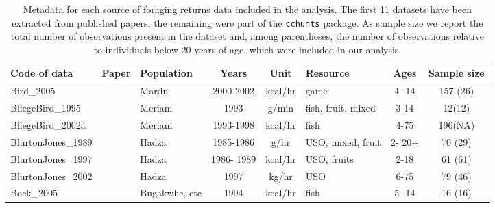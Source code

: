 \begin{landscape}
\begin{longtable}{M{2.6cm} M{3.6cm} M{1.5cm} c c M{1cm} c c}
\caption{Metadata for each source of foraging returns data included in the analysis. The first 11 datasets have been extracted from published papers, the remaining were part of the \texttt{cchunts} package. As sample size we report the total number of observations present in the dataset and, among parentheses, the number of observations relative to individuals below 20 years of age, which were included in our analysis. }\\
\hline
{} 
Code of data                  & Paper                                     & Population      & Years      & Unit      & Resource           & Ages    & Sample size \\ \hline
\endfirsthead
%
\endhead
%
Bird\_2005                     & \cite{bird_mardu_2005}                    & Mardu           & 2000-2002  & kcal/hr   & game               & 4- 14   & 157 (26)    \\
BliegeBird\_1995               & \cite{bird_children_1995}                 & Meriam          & 1993       & g/min     & fish, fruit, mixed & 3-14    & 12(12)      \\
BliegeBird\_2002a              & \cite{bird_constraints_2002}              & Meriam          & 1993-1998  & kcal/hr   & fish               & 4-75    & 196(NA)     \\
BlurtonJones\_1989             & \cite{blurton_jones_modelling_1989}       & Hadza           & 1985-1986  & g/hr      & USO, mixed, fruit  & 2- 20+  & 70 (29)     \\
BlurtonJones\_1997             & \cite{blurton_jones_why_1997}             & Hadza           & 1986- 1989 & kcal/hr   & USO, fruits        & 2-18    & 61 (61)     \\
BlurtonJones\_2002             & \cite{blurton_jones_selection_2002}       & Hadza           & 1997       & kg/hr     & USO                & 6-75    & 79 (46)     \\
Bock\_2005                     & \cite{bock_what_2005}                     & Bugakwhe, etc & 1994       & kcal/hr   & fish               & 5- 14   & 16 (16)     \\

\end{longtable}
\end{landscape}
